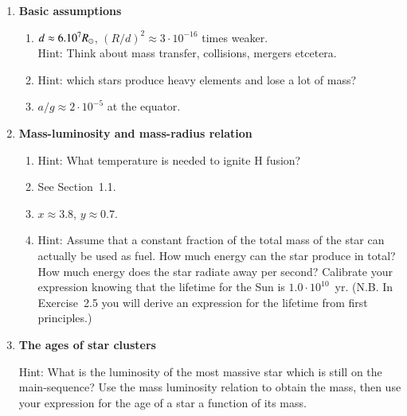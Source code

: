 \documentclass[11pt,a4paper]{report}
\begin{document}

\begin{enumerate}


\addtocounter{enumi}{1}  

\item {\bf Basic assumptions } 
  \begin{enumerate}
  \item $d \approx 6.10^7{R}_\odot$, $(R/d)^2 \approx 3\cdot10^{-16}$ times weaker. \\
    Hint: Think about mass transfer, collisions, mergers etcetera.
  \item Hint: which stars produce heavy elements and lose a lot of mass? 
  \item $a/g \approx 2\cdot10^{-5}$ at the equator.
  \end{enumerate}


\item {\bf Mass-luminosity and mass-radius relation} 
 
  \begin {enumerate}

  \item Hint: What temperature is needed to ignite H fusion?    

  \item See Section~1.1.
   
  \item $x \approx 3.8$, $y \approx 0.7$.
    
  \item Hint: Assume that a constant fraction of the total mass of the
    star can actually be used as fuel. How much energy can the star
    produce in total? How much energy does the star radiate away per
    second? Calibrate your expression knowing that the lifetime for
    the Sun is $1.0\cdot 10^{10}$~yr.  (N.B. In Exercise~2.5 you will derive an
    expression for the lifetime from first principles.)

  \end{enumerate}
\item  {\bf The ages of star clusters} 
  
  Hint: What is the luminosity of the most massive star which is still
  on the main-sequence? Use the mass luminosity relation to obtain the
  mass, then use your expression for the age of a star a function of
  its mass.
  




\end{enumerate}
\end{document}
